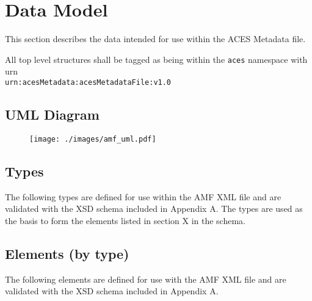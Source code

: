 \regularsectionformat	%

\newcommand{\xmlfield}[3]{
	\TabPositions{2em,1.75in,2.5in,2.6in}
	\tab\texttt{#1} \tab#2 \tab// #3	 \par
}

\chapter{Data Model}

This section describes the data intended for use within the ACES Metadata file.

All top level structures shall be tagged as being within the \texttt{aces} namespace with urn \\ \texttt{urn:acesMetadata:acesMetadataFile:v1.0}

\section{UML Diagram}
\begin{figure}[H]
  \centering
  \texttt{[image: ./images/amf\_uml.pdf]}
\end{figure}
\newpage

\section{Types}

The following types are defined for use within the AMF XML file and are validated with the XSD schema included in Appendix A.  The types are used as the basis to form the elements listed in section X in the schema.




\newpage
\section{Elements (by type)}

The following elements are defined for use with the AMF XML file and are validated with the XSD schema included in Appendix A. 




